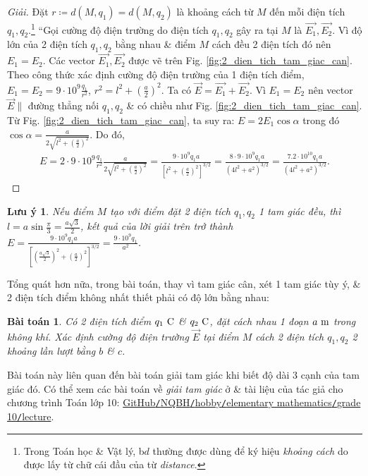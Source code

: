 \documentclass[oneside]{book}
\numberwithin{equation}{section}
\newtheorem{baitoan}{Bài toán}[section]
\newtheorem{luuy}{Lưu ý}[section]
\begin{document}
\begin{proof}[Giải]
	Đặt $r\coloneqq d(M,q_1) = d(M,q_2)$ là khoảng cách từ $M$ đến mỗi điện tích $q_1,q_2$.\footnote{Trong Toán học \& Vật lý, b$d$ thường được dùng để ký hiệu \textit{khoảng cách} do được lấy từ chữ cái đầu của từ \textit{distance}.} ``Gọi cường độ điện trường do điện tích $q_1,q_2$ gây ra tại $M$ là $\overrightarrow{E_1},\overrightarrow{E_2}$. Vì độ lớn của 2 điện tích $q_1,q_2$ bằng nhau \& điểm $M$ cách đều 2 điện tích đó nên $E_1 = E_2$. Các vector $\overrightarrow{E_1},\overrightarrow{E_2}$ được vẽ trên Fig. \ref{fig:2_dien_tich_tam_giac_can}. Theo công thức xác định cường độ điện trường của 1 điện tích điểm, $E_1 = E_2 = 9\cdot 10^9\frac{q_1}{r^2}$, $r^2 = l^2 + \left(\frac{a}{2}\right)^2$. Ta có $\overrightarrow{E} = \overrightarrow{E_1} + \overrightarrow{E_2}$. Vì $E_1 = E_2$ nên vector $\overrightarrow{E}\parallel$ đường thẳng nối $q_1,q_2$ \& có chiều như Fig. \ref{fig:2_dien_tich_tam_giac_can}. Từ Fig. \ref{fig:2_dien_tich_tam_giac_can}, ta suy ra: $E = 2E_1\cos\alpha$ trong đó $\cos\alpha = \frac{a}{2\sqrt{l^2 + \left(\frac{a}{2}\right)^2}}$. Do đó,
	\begin{align*}
		E = 2\cdot 9\cdot 10^9\frac{q_1}{r^2}\frac{a}{2\sqrt{l^2 + \left(\frac{a}{2}\right)^2}} = \frac{9\cdot 10^9q_1a}{\left[l^2 + \left(\frac{a}{2}\right)^2\right]^{3/2}} = \frac{8\cdot 9\cdot 10^9q_1a}{(4l^2 + a^2)^{3/2}} = \frac{7.2\cdot 10^{10}q_1a}{(4l^2 + a^2)^{3/2}}.
	\end{align*}
\end{proof}

\begin{luuy}
	Nếu điểm $M$ tạo với điểm đặt 2 điện tích $q_1,q_2$ 1 tam giác đều, thì $l = a\sin\frac{\pi}{3} = \frac{a\sqrt{3}}{2}$, kết quả của lời giải trên trở thành $E = \frac{9\cdot 10^9q_1a}{\left[\left(\frac{a\sqrt{3}}{2}\right)^2 + \left(\frac{a}{2}\right)^2\right]^{3/2}} = \frac{9\cdot 10^9q_1}{a^2}$.
\end{luuy}
Tổng quát hơn nữa, trong bài toán, thay vì tam giác cân, xét 1 tam giác tùy ý, \& 2 điện tích điểm không nhất thiết phải có độ lớn bằng nhau:

\begin{baitoan}
	Có 2 điện tích điểm $q_1\ {\rm C}$ \& $q_2\ {\rm C}$, đặt cách nhau 1 đoạn $a\ {\rm m}$ trong không khí. Xác định cường độ điện trường $\overrightarrow{E}$ tại điểm $M$ cách 2 điện tích $q_1,q_2$ 2 khoảng lần lượt bằng $b$ \& $c$.
\end{baitoan}
Bài toán này liên quan đến bài toán giải tam giác khi biết độ dài 3 cạnh của tam giác đó. Có thể xem các bài toán về \textit{giải tam giác} ở \cite[\S2, pp. 71--78]{SGK_Toan_10_Canh_Dieu_tap_1} \& tài liệu của tác giả cho chương trình Toán lớp 10: \href{https://github.com/NQBH/hobby/blob/master/elementary_mathematics/grade_10/NQBH_elementary_mathematics_grade_10.pdf}{GitHub\texttt{/}NQBH\texttt{/}hobby\texttt{/}elementary mathematics\texttt{/}grade 10\texttt{/}lecture}.
\end{document}
